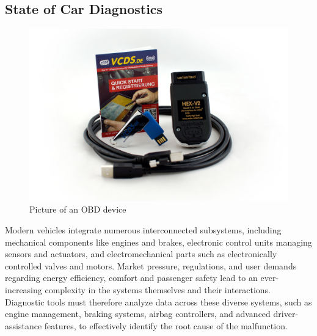 \documentclass[conference,a4paper]{IEEEtran}
\begin{document}
\subsection{State of Car Diagnostics}
\begin{figure}[ht]
  \centering
  \includegraphics[width=0.9\linewidth]{figures/obd_device.jpg}
  \caption{Picture of an OBD device}
  \label{fig:obd}
\end{figure}
Modern vehicles integrate numerous interconnected subsystems, including mechanical components like engines and brakes, 
electronic control units managing sensors and actuators, and electromechanical parts such as electronically controlled valves and motors. 
Market pressure, regulations, and user demands regarding energy efficiency, comfort and passenger safety lead to an ever-increasing complexity in the systems themselves and their interactions.
Diagnostic tools must therefore analyze data across these diverse systems, such as engine management, braking systems, airbag controllers, 
and advanced driver-assistance features, to effectively identify the root cause of the malfunction.
\end{document}
